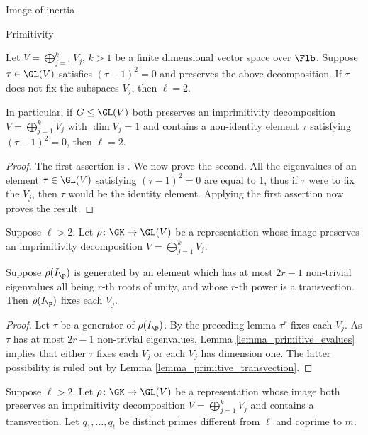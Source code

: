 \documentclass[11pt,a4paper]{article}
\begin{document}
\begin{section}{Image of inertia}
\begin{subsection}{Primitivity}
\begin{lemma}
\label{lemma_primitive_transvection}
Let $V= \bigoplus^k_{j=1} V_j$, $k>1$ be a finite dimensional vector space over $\Flb$. Suppose $\tau \in \GL(V)$ satisfies $(\tau -1)^2 =0$ and preserves the above decomposition.
If $\tau$ does not fix the subspaces $V_j$, then $\ell=2$.

In particular, if $G \leq \GL(V)$ both preserves an imprimitivity  decomposition $V= \bigoplus^k_{j=1} V_j$ with $\dim V_j =1$ and contains a non-identity element $\tau$ satisfying $(\tau -1)^2 =0$, then $\ell =2$.
\end{lemma}

\begin{proof}
The first assertion is \cite[Lemma 4.16]{Anni_VDok}. We now prove the second. All the eigenvalues of an element $\tau \in \GL(V)$ satisfying $(\tau -1)^2 =0$ are equal to 1, thus if $\tau$ were to fix the $V_j$, then $\tau$ would be the identity element. Applying the first assertion now proves the result.
\end{proof}

\begin{corollary}
\label{cor_primitivity_for_almost_transvection}
Suppose $\ell>2$. Let $\rho \colon \GK \rightarrow \GL(V)$ be a representation whose image preserves an imprimitivity  decomposition $V= \bigoplus^k_{j=1} V_j$. 

Suppose $\rho(I_\p)$ is generated by an element which has at most $2r-1$ non-trivial eigenvalues all being $r$-th roots of unity, and whose $r$-th power is a transvection.
Then $\rho(I_\p)$ fixes each $V_j$. 
\end{corollary}

\begin{proof}
 Let $\tau$ be a generator of $\rho(I_\p)$. By the preceding lemma $\tau^r$ fixes each $V_j$.
 As $\tau$ has at most $2r-1$ non-trivial eigenvalues, Lemma \ref{lemma_primitive_evalues} implies that either $\tau$ fixes each $V_j$ or each $V_j$ has dimension one.
 The latter possibility is ruled out by Lemma \ref{lemma_primitive_transvection}.
\end{proof}

\begin{proposition}
\label{prop_primitivity_strict_p_system_and_transvection}
Suppose $\ell>2$. Let $\rho \colon \GK \rightarrow \GL(V)$ be a representation whose image both preserves an imprimitivity  decomposition $V= \bigoplus^k_{j=1} V_j$ and contains a transvection. 
Let $q_1, \ldots, q_t$ be distinct primes different from $\ell$ and coprime to $m$.


\end{proposition}
\end{subsection}
\end{section}
\end{document}
